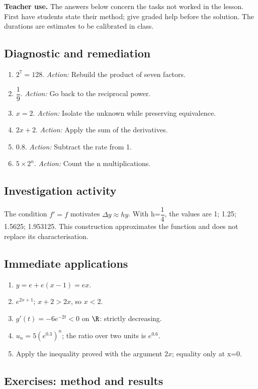 \label{C09-CORR}
\textbf{Teacher use.} The answers below concern the tasks not worked in the lesson. First have students state their method; give graded help before the solution. The durations are estimates to be calibrated in class.
\subsection*{Diagnostic and remediation}
\begin{enumerate}
\item $2^7=128$. \textit{Action:} Rebuild the product of seven factors.
\item $\dfrac{1}{9}$. \textit{Action:} Go back to the reciprocal power.
\item $x=2$. \textit{Action:} Isolate the unknown while preserving equivalence.
\item $2x+2$. \textit{Action:} Apply the sum of the derivatives.
\item $\num{0,8}$. \textit{Action:} Subtract the rate from 1.
\item $5\times2^n$. \textit{Action:} Count the n multiplications.
\end{enumerate}
\subsection*{Investigation activity}
The condition $f\prime=f$ motivates $\Delta y\approx h y$. With h=$\dfrac{1}{4}$, the values are 1; \num{1,25}; \num{1,5625}; \num{1,953125}. This construction approximates the function and does not replace its characterisation.
\subsection*{Immediate applications}
\begin{enumerate}
\item $y=e+e(x-1)=ex$.
\item $e^{2x+1}$; $x+2>2x$, so $x<2$.
\item $g\prime(t)=-6e^{-2t}<0$ on $\R$: strictly decreasing.
\item $u_n=5(e^{\num{0,3}})^n$; the ratio over two units is $e^{\num{0,6}}$.
\item Apply the inequality proved with the argument $2x$; equality only at x=0.
\end{enumerate}
\subsection*{Exercises: method and results}
